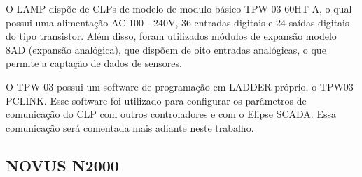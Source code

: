 O LAMP dispõe de CLPs de modelo de modulo básico TPW-03 60HT-A, o qual possui uma alimentação AC 100 - 240V, 36 entradas digitais e 24 saídas digitais do tipo transistor. Além disso, foram utilizados módulos de expansão modelo 8AD (expansão analógica), que dispõem de oito entradas analógicas, o que permite a captação de dados de sensores.

O TPW-03 possui um software de programação em LADDER próprio, o TPW03-PCLINK. Esse software foi utilizado para configurar os parâmetros de comunicação do CLP com outros controladores e com o Elipse SCADA. Essa comunicação será comentada mais adiante neste trabalho.

\subsection{NOVUS N2000}

